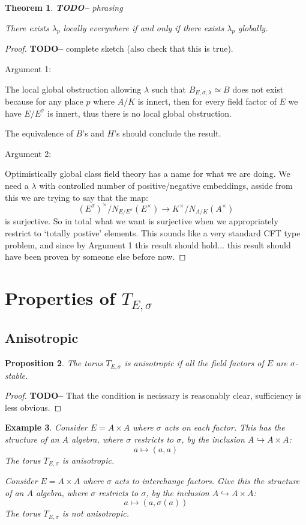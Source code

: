 \documentclass{article}
\theoremstyle{plain}
\newtheorem{theorem}{Theorem}[section]
\newtheorem{proposition}[theorem]{Proposition}
\newtheorem{example}[theorem]{Example}
\theoremstyle{definition}
\newcommand{\TODO}[1]{\textbf{TODO-#1}}
\begin{document}
\begin{theorem}
\TODO - phrasing

There exists $\lambda_p$ locally everywhere if and only if there exists $\lambda_p$ globally.
\end{theorem}
\begin{proof}
\TODO - complete sketch (also check that this is true).

Argument 1:

The local global obstruction allowing $\lambda$ such that $B_{E,\sigma,\lambda} \simeq B$ does not exist because for any place $p$ where $A/K$ is innert, then for every field factor of $E$ we have $E/E^\sigma$ is innert, thus there is no local global obstruction.

The equivalence of $B$'s and $H$'s should conclude the result.

\bigskip
Argument 2:

Optimistically global class field theory has a name for what we are doing.
We need a $\lambda$ with controlled number of positive/negative embeddings, asside from this we are trying to say that the map:
\[ (E^\sigma)^\times/N_{E/E^\sigma}(E^\times) \rightarrow K^\times/N_{A/K}(A^\times) \]
is surjective.
So in total what we want is surjective when we appropriately restrict to `totally postive' elements. This sounds like a very standard CFT type problem, and since by Argument 1 this result should hold... this result should have been proven by someone else before now.
\end{proof}


\section{Properties of $T_{E,\sigma}$}

\subsection{Anisotropic}

\begin{proposition}
The torus $T_{E,\sigma}$ is anisotropic if all the field factors of $E$ are $\sigma$-stable.
\end{proposition}
\begin{proof}
\TODO-
That the condition is necissary is reasonably clear, sufficiency is less obvious.
\end{proof}

\begin{example}
Consider $E = A \times A$ where $\sigma$ acts on each factor.
This has the structure of an $A$ algebra, where $\sigma$ restricts to $\sigma$, by the inclusion $A\hookrightarrow A\times A$:
\[ a \mapsto (a,a) \]
The torus $T_{E,\sigma}$ is anisotropic.

\bigskip
Consider $E = A \times A$ where $\sigma$ acts to interchange factors.
Give this the structure of an $A$ algebra, where $\sigma$ restricts to $\sigma$, by the inclusion $A\hookrightarrow A\times A$:
\[ a \mapsto (a,\sigma(a)) \]
The torus $T_{E,\sigma}$ is not anisotropic.
\end{example}
\end{document}

